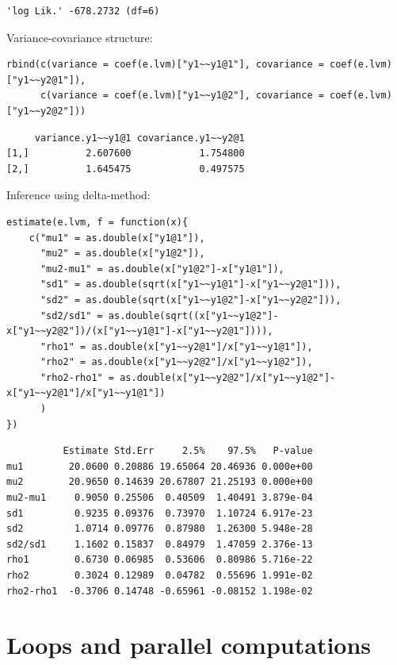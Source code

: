 \documentclass{article}
\begin{document}
\begin{verbatim}
'log Lik.' -678.2732 (df=6)
\end{verbatim}

Variance-covariance structure:
\lstset{language=r,label= ,caption= ,captionpos=b,numbers=none}
\begin{lstlisting}
rbind(c(variance = coef(e.lvm)["y1~~y1@1"], covariance = coef(e.lvm)["y1~~y2@1"]),
      c(variance = coef(e.lvm)["y1~~y1@2"], covariance = coef(e.lvm)["y1~~y2@2"]))
\end{lstlisting}

\begin{verbatim}
     variance.y1~~y1@1 covariance.y1~~y2@1
[1,]          2.607600            1.754800
[2,]          1.645475            0.497575
\end{verbatim}

Inference using delta-method:
\lstset{language=r,label= ,caption= ,captionpos=b,numbers=none}
\begin{lstlisting}
estimate(e.lvm, f = function(x){
    c("mu1" = as.double(x["y1@1"]),
      "mu2" = as.double(x["y1@2"]),
      "mu2-mu1" = as.double(x["y1@2"]-x["y1@1"]),
      "sd1" = as.double(sqrt(x["y1~~y1@1"]-x["y1~~y2@1"])),
      "sd2" = as.double(sqrt(x["y1~~y1@2"]-x["y1~~y2@2"])),
      "sd2/sd1" = as.double(sqrt((x["y1~~y1@2"]-x["y1~~y2@2"])/(x["y1~~y1@1"]-x["y1~~y2@1"]))),
      "rho1" = as.double(x["y1~~y2@1"]/x["y1~~y1@1"]),
      "rho2" = as.double(x["y1~~y2@2"]/x["y1~~y1@2"]),
      "rho2-rho1" = as.double(x["y1~~y2@2"]/x["y1~~y1@2"]-x["y1~~y2@1"]/x["y1~~y1@1"])
      )
})
\end{lstlisting}

\begin{verbatim}
          Estimate Std.Err     2.5%    97.5%   P-value
mu1        20.0600 0.20886 19.65064 20.46936 0.000e+00
mu2        20.9650 0.14639 20.67807 21.25193 0.000e+00
mu2-mu1     0.9050 0.25506  0.40509  1.40491 3.879e-04
sd1         0.9235 0.09376  0.73970  1.10724 6.917e-23
sd2         1.0714 0.09776  0.87980  1.26300 5.948e-28
sd2/sd1     1.1602 0.15837  0.84979  1.47059 2.376e-13
rho1        0.6730 0.06985  0.53606  0.80986 5.716e-22
rho2        0.3024 0.12989  0.04782  0.55696 1.991e-02
rho2-rho1  -0.3706 0.14748 -0.65961 -0.08152 1.198e-02
\end{verbatim}

\section{Loops and parallel computations}
\label{sec:org42ea292}
\end{document}
